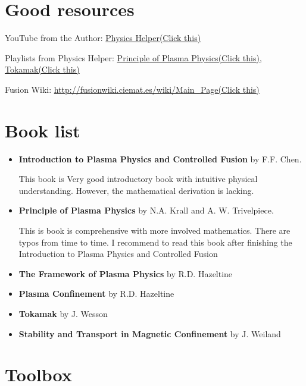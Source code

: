 \section{Good resources}


YouTube from the Author: \href{https://www.youtube.com/channel/UC6jkDBotAWxHo3glzN1Iakw?view_as=subscriber}{Physics Helper(Click this)}

Playlists from Physics Helper: 
\href{https://www.youtube.com/playlist?list=PLgNi5MiqkBWZ2RZLn9p0iagtuxnHCOrFy}{Principle of Plasma Physics(Click this)}, 
\href{https://www.youtube.com/playlist?list=PLgNi5MiqkBWaKBISc3Ed0W-rDHZnrLNFn}{Tokamak(Click this)}

Fusion Wiki: \href{http://fusionwiki.ciemat.es/wiki/Main_Page}{http://fusionwiki.ciemat.es/wiki/Main\_Page(Click this)}

\section{Book list}
\begin{itemize}
    \item \textbf{Introduction to Plasma Physics and Controlled Fusion} by F.F. Chen. 
    
    This book is Very good introductory book with intuitive physical understanding. However, the mathematical derivation is lacking. 
    
    \item \textbf{Principle of Plasma Physics} by N.A. Krall and A. W. Trivelpiece. 
    
    This is book is comprehensive with more involved mathematics. There are typos from time to time. I recommend to read this book after finishing the Introduction to Plasma Physics and Controlled Fusion
    
    \item \textbf{The Framework of Plasma Physics} by R.D. Hazeltine
    
    \item \textbf{Plasma Confinement} by R.D. Hazeltine
    
    \item \textbf{Tokamak} by J. Wesson
    
    \item \textbf{Stability and Transport in Magnetic Confinement} by J. Weiland
\end{itemize}


\section{Toolbox}

